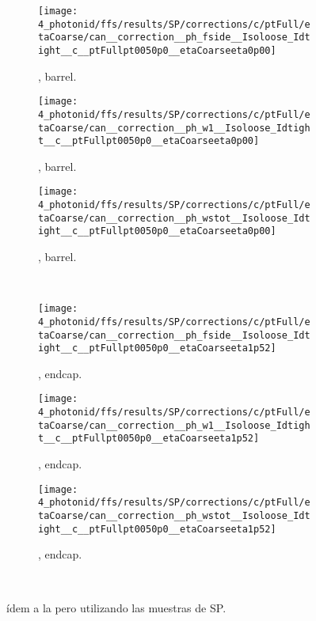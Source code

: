 \begin{figure}[ht!]
    \centering
    \begin{subfigure}[h]{0.32\linewidth}
        \centering
        \texttt{[image: 4\_photonid/ffs/results/SP/corrections/c/ptFull/etaCoarse/can\_\_correction\_\_ph\_fside\_\_Isoloose\_Idtight\_\_c\_\_ptFullpt0050p0\_\_etaCoarseeta0p00]}
        \caption{\fside, barrel.}
    \end{subfigure}
    \hfill
    \begin{subfigure}[h]{0.32\linewidth}
        \centering
        \texttt{[image: 4\_photonid/ffs/results/SP/corrections/c/ptFull/etaCoarse/can\_\_correction\_\_ph\_w1\_\_Isoloose\_Idtight\_\_c\_\_ptFullpt0050p0\_\_etaCoarseeta0p00]}
        \caption{\wone, barrel.}
    \end{subfigure}
    \hfill
    \begin{subfigure}[h]{0.32\linewidth}
        \centering
        \texttt{[image: 4\_photonid/ffs/results/SP/corrections/c/ptFull/etaCoarse/can\_\_correction\_\_ph\_wstot\_\_Isoloose\_Idtight\_\_c\_\_ptFullpt0050p0\_\_etaCoarseeta0p00]}
        \caption{\wstot, barrel.}
    \end{subfigure}\\
    \begin{subfigure}[h]{0.32\linewidth}
        \centering
        \texttt{[image: 4\_photonid/ffs/results/SP/corrections/c/ptFull/etaCoarse/can\_\_correction\_\_ph\_fside\_\_Isoloose\_Idtight\_\_c\_\_ptFullpt0050p0\_\_etaCoarseeta1p52]}
        \caption{\fside, endcap.}
    \end{subfigure}
    \hfill
    \begin{subfigure}[h]{0.32\linewidth}
        \centering
        \texttt{[image: 4\_photonid/ffs/results/SP/corrections/c/ptFull/etaCoarse/can\_\_correction\_\_ph\_w1\_\_Isoloose\_Idtight\_\_c\_\_ptFullpt0050p0\_\_etaCoarseeta1p52]}
        \caption{\wone, endcap.}
    \end{subfigure}
    \hfill
    \begin{subfigure}[h]{0.32\linewidth}
        \centering
        \texttt{[image: 4\_photonid/ffs/results/SP/corrections/c/ptFull/etaCoarse/can\_\_correction\_\_ph\_wstot\_\_Isoloose\_Idtight\_\_c\_\_ptFullpt0050p0\_\_etaCoarseeta1p52]}
        \caption{\wstot, endcap.}
    \end{subfigure}\\
    \caption{ídem a la \Fig{\ref{fig:ss_corrections:ffs:results:ss_rz}} pero utilizando las muestras de \ac{SP}.}
    \label{fig:ss_corrections:ffs:results:ss_sp}
\end{figure}
























